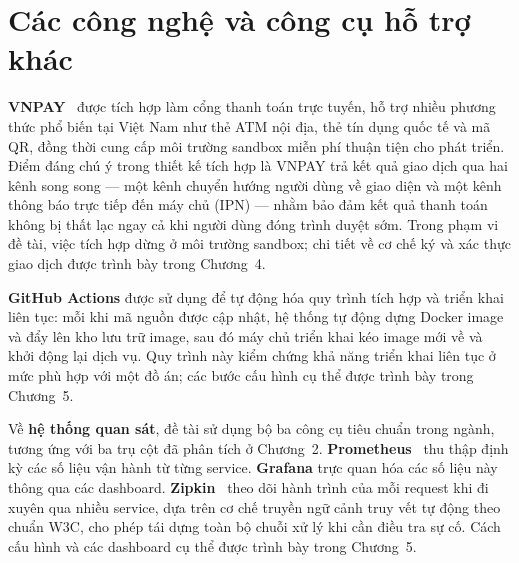 \documentclass[../DoAn.tex]{subfiles}
\begin{document}


\section{Các công nghệ và công cụ hỗ trợ khác}
\label{section:3.8}

\textbf{VNPAY}~\cite{vnpay_docs} được tích hợp làm cổng thanh toán trực tuyến, hỗ trợ nhiều
phương thức phổ biến tại Việt Nam như thẻ ATM nội địa, thẻ tín dụng quốc tế và mã QR, đồng
thời cung cấp môi trường sandbox miễn phí thuận tiện cho phát triển. Điểm đáng chú ý trong
thiết kế tích hợp là VNPAY trả kết quả giao dịch qua hai kênh song song --- một kênh chuyển
hướng người dùng về giao diện và một kênh thông báo trực tiếp đến máy chủ (IPN) --- nhằm bảo
đảm kết quả thanh toán không bị thất lạc ngay cả khi người dùng đóng trình duyệt sớm. Trong
phạm vi đề tài, việc tích hợp dừng ở môi trường sandbox; chi tiết về cơ chế ký và xác thực
giao dịch được trình bày trong Chương~4.

\textbf{GitHub Actions} được sử dụng để tự động hóa quy trình tích hợp và triển khai liên tục:
mỗi khi mã nguồn được cập nhật, hệ thống tự động dựng Docker image và đẩy lên kho lưu trữ
image, sau đó máy chủ triển khai kéo image mới về và khởi động lại dịch vụ. Quy trình này
kiểm chứng khả năng triển khai liên tục ở mức phù hợp với một đồ án; các bước cấu hình cụ thể
được trình bày trong Chương~5.

Về \textbf{hệ thống quan sát}, đề tài sử dụng bộ ba công cụ tiêu chuẩn trong ngành, tương ứng
với ba trụ cột đã phân tích ở Chương~2. \textbf{Prometheus}~\cite{prometheus_docs} thu thập
định kỳ các số liệu vận hành từ từng service. \textbf{Grafana} trực quan hóa các số liệu này
thông qua các dashboard. \textbf{Zipkin}~\cite{zipkin_docs} theo dõi hành trình của mỗi
request khi đi xuyên qua nhiều service, dựa trên cơ chế truyền ngữ cảnh truy vết tự động theo
chuẩn W3C, cho phép tái dựng toàn bộ chuỗi xử lý khi cần điều tra sự cố. Cách cấu hình và các
dashboard cụ thể được trình bày trong Chương~5.
\end{document}

